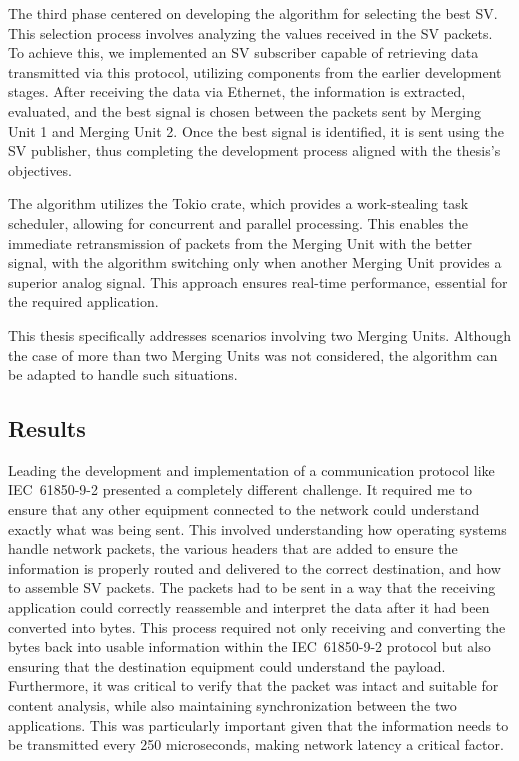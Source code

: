 The third phase centered on developing the algorithm for selecting the best SV. This selection process involves analyzing the values received in the SV packets. To achieve this, we implemented an SV subscriber capable of retrieving data transmitted via this protocol, utilizing components from the earlier development stages. After receiving the data via Ethernet, the information is extracted, evaluated, and the best signal is chosen between the packets sent by Merging Unit 1 and Merging Unit 2. Once the best signal is identified, it is sent using the SV publisher, thus completing the development process aligned with the thesis's objectives.

The algorithm utilizes the Tokio crate, which provides a work-stealing task scheduler, allowing for concurrent and parallel processing. This enables the immediate retransmission of packets from the Merging Unit with the better signal, with the algorithm switching only when another Merging Unit provides a superior analog signal. This approach ensures real-time performance, essential for the required application.

This thesis specifically addresses scenarios involving two Merging Units. Although the case of more than two Merging Units was not considered, the algorithm can be adapted to handle such situations.

\subsection{Results}

Leading the development and implementation of a communication protocol like IEC~61850-9-2 presented a completely different challenge. It required me to ensure that any other equipment connected to the network could understand exactly what was being sent. This involved understanding how operating systems handle network packets, the various headers that are added to ensure the information is properly routed and delivered to the correct destination, and how to assemble SV packets. The packets had to be sent in a way that the receiving application could correctly reassemble and interpret the data after it had been converted into bytes. This process required not only receiving and converting the bytes back into usable information within the IEC~61850-9-2 protocol but also ensuring that the destination equipment could understand the payload. Furthermore, it was critical to verify that the packet was intact and suitable for content analysis, while also maintaining synchronization between the two applications. This was particularly important given that the information needs to be transmitted every 250 microseconds, making network latency a critical factor.

